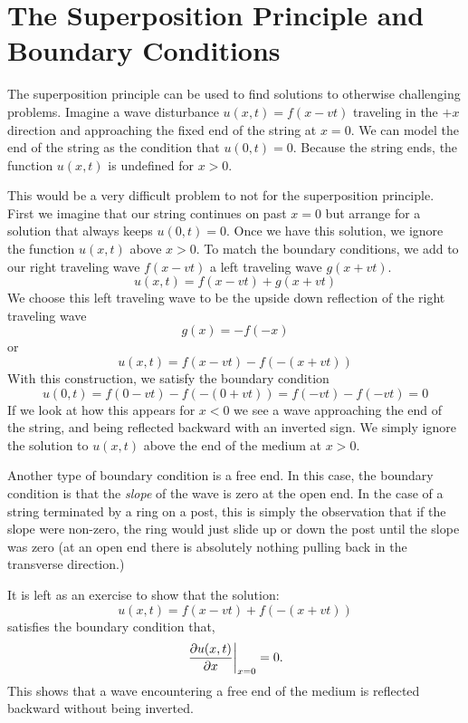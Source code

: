 \documentclass[12pt]{article}
\begin{document}
\section{The Superposition Principle and Boundary Conditions}

The superposition principle can be used to find solutions to otherwise challenging problems. Imagine a wave disturbance $u(x,t) = f(x-vt)$ traveling in the $+x$ direction and approaching the fixed end of the string at $x=0$.  We can model the end of the string as the condition that $u(0,t) = 0$. Because the string ends, the function $u(x,t)$ is undefined for $x>0$.  

This would be a very difficult problem to not for the superposition principle.  First we imagine that our string continues on past $x=0$ but arrange for a solution that always keeps $u(0,t) = 0$.   Once we have this solution, we ignore the function $u(x,t)$ above $x>0$.  To match the boundary conditions, we add to our right traveling wave $f(x-vt)$ a left traveling wave $g(x+vt)$.
\begin{displaymath}
u(x,t) = f(x-vt) + g(x+vt)
\end{displaymath}
We choose this left traveling wave to be the upside down reflection of the right traveling wave
\begin{displaymath}
g(x) = -f(-x) 
\end{displaymath}
or
\begin{displaymath}
u(x,t) = f(x-vt)  - f(-(x+vt))
\end{displaymath}
With this construction, we satisfy the boundary condition 
\begin{displaymath}
u(0,t) = f(0-vt)  - f(-(0+vt)) = f(-vt) - f(-vt) = 0
\end{displaymath}
If we look at how this appears for $x<0$ we see a wave approaching the end of the string, and being reflected backward with an inverted sign.  We simply ignore the solution to $u(x,t)$ above the end of the medium at $x>0$.

Another type of boundary condition is a free end.  In this case, the boundary condition is that the {\em slope} of the wave is zero at the open end.  In the case of a string terminated by a ring on a post, this is simply the observation that if the slope were non-zero, the ring would just slide up or down the post until the slope was zero (at an open end there is absolutely nothing pulling back in the transverse direction.)  

It is left as an exercise to show that the solution:
\begin{displaymath}
u(x,t) = f(x-vt)  + f(-(x+vt))
\end{displaymath}
satisfies the boundary condition that,
\begin{displaymath}
\left. \frac{\partial u(x,t)}{\partial x} \right|_{x=0} = 0.
\end{displaymath}
This shows that a wave encountering a free end of the medium is reflected backward without being inverted.
\end{document}

